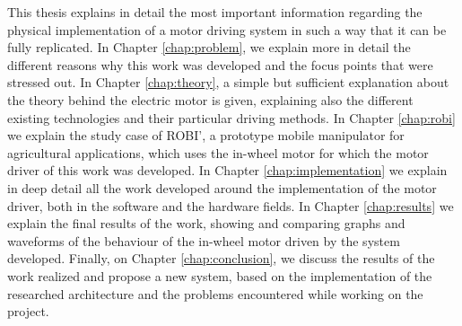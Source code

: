 This thesis explains in detail the most important information regarding the physical implementation of a motor driving system in such a way that it can be fully replicated. In Chapter \ref{chap:problem}, we explain more in detail the different reasons why this work was developed and the focus points that were stressed out. In Chapter \ref{chap:theory}, a simple but sufficient explanation about the theory behind the electric motor is given, explaining also the different existing technologies and their particular driving methods. In Chapter \ref{chap:robi} we explain the study case of ROBI', a prototype mobile manipulator for agricultural applications, which uses the in-wheel motor for which the motor driver of this work was developed. In Chapter \ref{chap:implementation} we explain in deep detail all the work developed around the implementation of the motor driver, both in the software and the hardware fields. In Chapter \ref{chap:results} we explain the final results of the work, showing and comparing graphs and waveforms of the behaviour of the in-wheel motor driven by the system developed. Finally, on Chapter \ref{chap:conclusion}, we discuss the results of the work realized and propose a new system, based on the implementation of the researched architecture and the problems encountered while working on the project.